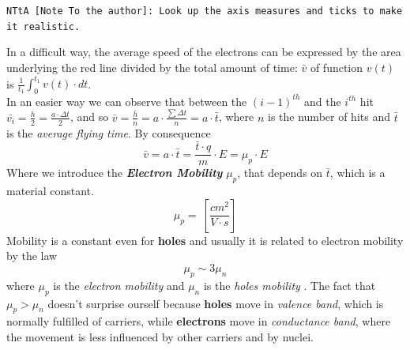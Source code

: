\documentclass[12pt]{article}
\newcommand{\B}{\textbf}
\newcommand{\I}{\textit}
\begin{document}
 \verb|NTtA [Note To the author]: Look up the axis measures and ticks to make it realistic. |
\begin{center}
\end{center}
In a difficult way, the average speed of the electrons can be expressed by the area underlying the red line divided by the total amount of time: $\bar{v}$ of function $v(t)$ is $\frac{1}{t_1}\int_{0}^{t_1} v(t) \cdot dt$.\\
In an easier way we can observe that between the $(i-1)^{th}$  and the $i^{th}$ hit $\bar{v_i} = \frac{h}{2} = \frac{a\cdot \Delta t}{2}$, and so $\bar{v} = \frac{\bar{h}}{n}= a \cdot \frac{\sum\Delta t}{n} = a \cdot \bar{t}$, where $n$ is the number of hits and $\bar{t}$ is the \I{average flying time}. 
By consequence
\begin{equation}
	\bar{v} = a \cdot \bar{t} = \frac{\bar{t} \cdot q}{m}\cdot E = \mu_p \cdot E
\end{equation}  
Where we introduce the  \B{\I{Electron Mobility}} $\mu_p$, that depends on $\bar{t}$, which is a material constant.
\begin{equation}
	\mu_p = \ [\frac{cm^2}{V \cdot s}]
\end{equation}  
Mobility is a constant even for \B{holes} and usually it is related to electron mobility by the law
\begin{equation}
	\mu_p \sim 3\mu_n
\end{equation}
where $\mu_p$ is the \I{electron mobility} and $\mu_n$ is the \I{holes mobility} . 
The fact that $\mu_p > \mu_n$ doesn't surprise ourself because \B{holes} move in \I{valence band}, which is normally fulfilled of carriers, while \B{electrons} move in \I{conductance band}, where the movement is less influenced by other carriers and by nuclei.  
\end{document}
